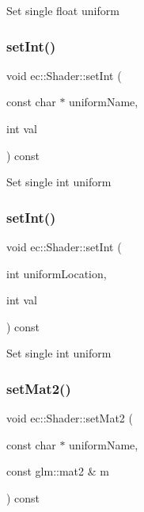 Set single float uniform \mbox{\label{classec_1_1_shader_af9d30a0d4f1b2e469fe41a232ebf0614}} 
\subsubsection{\texorpdfstring{set\+Int()}{setInt()}\hspace{0.1cm}{\footnotesize\ttfamily [1/2]}}
{\footnotesize\ttfamily void ec\+::\+Shader\+::set\+Int (\begin{DoxyParamCaption}\item[{const char $\ast$}]{uniform\+Name,  }\item[{int}]{val }\end{DoxyParamCaption}) const}

Set single int uniform \mbox{\label{classec_1_1_shader_a4fa159ab084304c3e5549602d3e37bff}} 
\subsubsection{\texorpdfstring{set\+Int()}{setInt()}\hspace{0.1cm}{\footnotesize\ttfamily [2/2]}}
{\footnotesize\ttfamily void ec\+::\+Shader\+::set\+Int (\begin{DoxyParamCaption}\item[{int}]{uniform\+Location,  }\item[{int}]{val }\end{DoxyParamCaption}) const}

Set single int uniform \mbox{\label{classec_1_1_shader_a47782ae05dace705129f12b9feec03ce}} 
\subsubsection{\texorpdfstring{set\+Mat2()}{setMat2()}\hspace{0.1cm}{\footnotesize\ttfamily [1/2]}}
{\footnotesize\ttfamily void ec\+::\+Shader\+::set\+Mat2 (\begin{DoxyParamCaption}\item[{const char $\ast$}]{uniform\+Name,  }\item[{const glm\+::mat2 \&}]{m }\end{DoxyParamCaption}) const}

